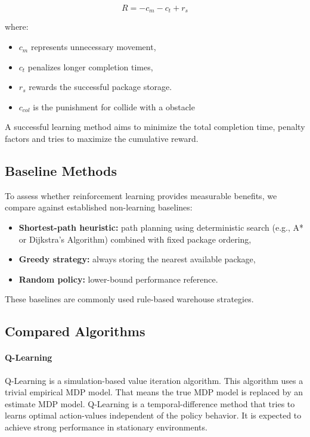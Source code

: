 \documentclass{article}
\begin{document}
\begin{equation}
R = -c_{m} - c_{t} + r_{s}
\end{equation}

where:
\begin{itemize}
    \item $c_{m}$ represents unnecessary movement,
    \item $c_{t}$ penalizes longer completion times,
    \item $r_{s}$ rewards the successful package storage.
    \item $c_{col}$ is the punishment for collide with a obstacle
\end{itemize}

A successful learning method aims to minimize the total completion time, penalty factors and tries to maximize the cumulative reward.

\subsection{Baseline Methods}

To assess whether reinforcement learning provides measurable benefits, we compare against established non-learning baselines:

\begin{itemize}
    \item \textbf{Shortest-path heuristic:} path planning using deterministic search (e.g., A* or Dijkstra’s Algorithm) combined with fixed package ordering,
    \item \textbf{Greedy strategy:} always storing the nearest available package,
    \item \textbf{Random policy:} lower-bound performance reference.
\end{itemize}

These baselines are commonly used rule-based warehouse strategies.

\subsection{Compared Algorithms}

\paragraph{Q-Learning}
Q-Learning is a simulation-based value iteration algorithm. This algorithm uses a trivial empirical MDP model. That means the true MDP model is replaced by an estimate MDP model. 
Q-Learning is a temporal-difference method that tries to learns optimal action-values independent of the policy behavior. It is expected to achieve strong performance in stationary environments.
\end{document}
